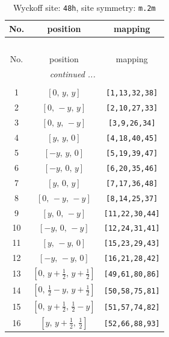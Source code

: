 \documentclass[fleqn,8pt]{jsarticle}
\begin{document}
\begin{longtable}{ccc}
\caption{Wyckoff site: {\tt 48h}, site symmetry: {\tt m.2m}}
 \\
 \hline \hline
No. & position & mapping \\ \hline \endfirsthead

\multicolumn{2}{l}{\tablename\ \thetable{}} \\
 \hline \hline
No. & position & mapping \\ \hline \endhead

 \hline \hline
\multicolumn{2}{r}{\footnotesize\it continued ...} \\ \endfoot

 \hline \hline
\multicolumn{2}{r}{} \\ \endlastfoot

1 & $\left[ 0,\, y,\, y \right]$ & {\tt [1,13,32,38]} \\ \hline
2 & $\left[ 0,\, - y,\, y \right]$ & {\tt [2,10,27,33]} \\ \hline
3 & $\left[ 0,\, y,\, - y \right]$ & {\tt [3,9,26,34]} \\ \hline
4 & $\left[ y,\, y,\, 0 \right]$ & {\tt [4,18,40,45]} \\ \hline
5 & $\left[ - y,\, y,\, 0 \right]$ & {\tt [5,19,39,47]} \\ \hline
6 & $\left[ - y,\, 0,\, y \right]$ & {\tt [6,20,35,46]} \\ \hline
7 & $\left[ y,\, 0,\, y \right]$ & {\tt [7,17,36,48]} \\ \hline
8 & $\left[ 0,\, - y,\, - y \right]$ & {\tt [8,14,25,37]} \\ \hline
9 & $\left[ y,\, 0,\, - y \right]$ & {\tt [11,22,30,44]} \\ \hline
10 & $\left[ - y,\, 0,\, - y \right]$ & {\tt [12,24,31,41]} \\ \hline
11 & $\left[ y,\, - y,\, 0 \right]$ & {\tt [15,23,29,43]} \\ \hline
12 & $\left[ - y,\, - y,\, 0 \right]$ & {\tt [16,21,28,42]} \\ \hline
13 & $\left[ 0,\, y + \frac{1}{2},\, y + \frac{1}{2} \right]$ & {\tt [49,61,80,86]} \\ \hline
14 & $\left[ 0,\, \frac{1}{2} - y,\, y + \frac{1}{2} \right]$ & {\tt [50,58,75,81]} \\ \hline
15 & $\left[ 0,\, y + \frac{1}{2},\, \frac{1}{2} - y \right]$ & {\tt [51,57,74,82]} \\ \hline
16 & $\left[ y,\, y + \frac{1}{2},\, \frac{1}{2} \right]$ & {\tt [52,66,88,93]} \\ \hline

\end{longtable}
\end{document}
